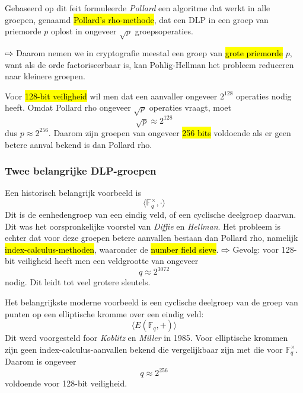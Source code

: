 Gebaseerd op dit feit formuleerde \emph{Pollard} een algoritme dat werkt in alle groepen, genaamd \hl{Pollard's rho-methode}, dat een DLP in een groep van priemorde $p$ oplost in ongeveer $\sqrt{p}$ groepsoperaties.

$\rightwhitearrow$ Daarom nemen we in cryptografie meestal een groep van \hl{grote priemorde} $p$, want als de orde factoriseerbaar is, kan Pohlig-Hellman het probleem reduceren naar kleinere groepen.

Voor \hl{128-bit veiligheid} wil men dat een aanvaller ongeveer $2^{128}$ operaties nodig heeft. Omdat Pollard rho ongeveer $\sqrt{p}$ operaties vraagt, moet
\begin{equation*}
    \sqrt{p} \approx 2^{128}
\end{equation*}
dus $p \approx 2^{256}$. Daarom zijn groepen van ongeveer \hl{256 bits} voldoende als er geen betere aanval bekend is dan Pollard rho.

\subsubsection*{Twee belangrijke DLP-groepen}


Een historisch belangrijk voorbeeld is
\begin{equation*}
    \langle\mathbb{F}_q^\times, \cdot \rangle 
\end{equation*}
Dit is de eenhedengroep van een eindig veld, of een cyclische deelgroep daarvan.
Dit was het oorspronkelijke voorstel van \emph{Diffie} en \emph{Hellman}. Het probleem is echter dat voor deze groepen betere aanvallen bestaan dan Pollard rho, namelijk \hl{index-calculus-methoden}, waaronder de \hl{number field sieve}. \newline
$\rightwhitearrow$ Gevolg: voor 128-bit veiligheid heeft men een veldgrootte van ongeveer
\begin{equation*}
    q \approx 2^{3072}
\end{equation*}
nodig. Dit leidt tot veel grotere sleutels.


Het belangrijkste moderne voorbeeld is een cyclische deelgroep van de groep van punten op een elliptische kromme over een eindig veld:
\begin{equation*}
    \langle E\left(\mathbb{F}_q, +\right) \rangle
\end{equation*}
Dit werd voorgesteld foor \emph{Koblitz} en \emph{Miller} in 1985. Voor elliptische krommen zijn geen index-calculus-aanvallen bekend die vergelijkbaar zijn met die voor $\mathbb{F}_q^\times$. Daarom is ongeveer
\begin{equation*}
    q \approx 2^{256}
\end{equation*}
voldoende voor 128-bit veiligheid.

